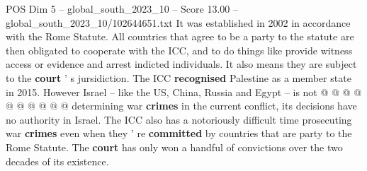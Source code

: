 \begin{textsample}{POS Dim 5 – global\_south\_2023\_10 – Score 13.00 – global\_south\_2023\_10/102644651.txt}
It was established in 2002 in accordance with the Rome Statute.
All countries that agree to be a party to the statute are then obligated to cooperate with the ICC, and to do things like provide witness access or evidence and arrest indicted individuals.
It also means they are subject to the \textbf{court} ' s jursidiction.
The ICC \textbf{recognised} Palestine as a member state in 2015.
However Israel -- like the US, China, Russia and Egypt -- is not @ @ @ @ @ @ @ @ @ @ determining war \textbf{crimes} in the current conflict, its decisions have no authority in Israel.
The ICC also has a notoriously difficult time prosecuting war \textbf{crimes} even when they ' re \textbf{committed} by countries that are party to the Rome Statute.
The \textbf{court} has only won a handful of convictions over the two decades of its existence.

\end{textsample}
